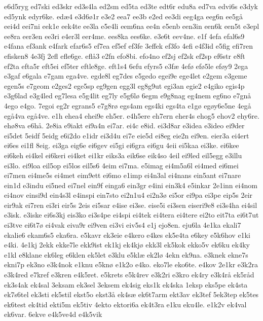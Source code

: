 {e6d5ryg
ed7ski
ed3skr
ed3s4la
ed2sm
ed5ta
ed3te
edt6r
edu8a
ed7va
edvi6s
e3dyk
ed5ynk
edyr6ke.
ed^^e64
e3d6^^f81r
e3e2
eea7
ee3b
e2ed
ee3di
eeg4ga
eeg6n
ee5g^^e5
eei4d
eei7ni
eek1e
eek4te
ee3la
e5e4li
eem6na
ee4n
e5enb
een3in
een6k
een5t
e3epl
ee8ra
eer3en
ee3ri
e4er3l
eer4me.
ees8ka
ees6ke.
e3e6t
eev4ne.
e1f
4efa
efal6s9
e4fana
ef3ank
e4fark
efar6s5
ef7ea
ef5ef
ef3fe
3effek
ef3fo
4efi
e4f3id
e5fig
efi7ren
efisken8
4e3fj
2efl
efle6ge.
efl^^e53
e2fn
efo8bi.
efo4no
ef2sj
ef2sk
ef2sp
ef6str
e8ft
ef2ta
efta5r
eft5ei
ef5ter
eftle8ge.
eft1s4
6efu
efyrs5
e3f^^e6
4ef^^f8
ef^^f85le
ef^^f8y9
2ega
e3gaf
e6gala
e7gam
ega4ve.
egde8l
eg7des
e5gedo
egei9e
ege4let
e2gem
e3geme
egen5s
e7geom
e2ges2
ege5sp
eg9gen
egg3l
eg8g9ut
egi3an
egie2
e4giko
egis4p
e3g6lad
e3g4led
eg7lesa
e5g4lit
eg7ly
e5g6l^^f8
6egm
e9g8nag
eg4nem
eg6no
e7gn^^e5
4ego
e4go.
7egoi
eg2r
egrans5
e7g8r^^f8
egs4am
egs4ki
egs4ta
e1g^^f8
eg^^f8y6e5ne
4eg^^e5
eg^^e54va
eg^^e54ve.
e1h
ehea4
ehei9e
eh5er.
e4h5ere
eh7ern
eher4s
ehog5
ehov2
ehy6re.
eh^^f88va
e6h^^e5.
2e8ia
e9iakt
ei9a4n
ei7ar.
ei4c
e8id.
ei3d8ar
e3idea
e3ideo
ei9der
ei5det
5eidf
5eidg
e6i2do
e1idr
ei3d4u
ei7e
eie5d
ei8eg
eie2n
ei9en.
eier3a
ei4ert
ei6es
ei1fl
8eig.
ei3ga
eig6e
ei6gev
ei5gi
ei6gra
ei6gu
4eii
ei5kaa
ei3ke.
ei6kee
ei6keh
ei4kel
ei6keri
ei4ket
ei1kr
eiks3a
eik6se
eik4so
4eil
ei9led
eil5egg
e3illu
ei3lo.
ei9loa
eil5op
ei5los
eil5s6
4eim
ei7ma.
e5imag
ei4m5a6l
ei4med
ei6mei
ei7men
ei4me5s
ei4met
eim9ett
ei6mo
e1imp
ei4n3al
ei4nans
ein5ant
ei7nare
ein1d
e3indu
ei5ned
ei7nel
ein9f
einga6
ein3gr
e4ini
ein3k4
e5inkar
2e1inn
ei4nom
ei4nov
einsi9d
ein4s3l
e4inspi
ein7sto
ei2n1u4
ei2n3^^f8
ei5or
ei9pa
ei3pe
eip5s
2eir
eir9ak
ei7ren
ei3ri
eir5s
2eis
ei5sar
e4ise
ei3se.
eise5i
ei3sen
eiseri9e8
ei3s4ha
ei4sil
e3isk.
e3iske
ei6s3kj
eis3ko
ei3s4pe
ei4spi
ei4tek
ei4tera
ei4tere
ei2to
eit7ta
ei6t7ut
ei3tve
ei6t7^^f8
ei4vak
eiva9r
ei9ven
ei3vi
eiv5s4
e1j
ejo8en.
eju6la
4e1ka
ekali7
ekalie6
ekam6s5
eka6ra.
e5kavr
ek3eie
e4kero
e4kes
ek5e4ta
e6key
e5k6hov
e1ki
e4ki.
4e1kj
2ekk
ekke7le
ekk9ist
ek1kj
ek4kj^^f8
ekk3l
ek5kok
ekko5v
ek6ku
ek4ky
e1kl
e8klane
ek6leg
e6klen
ek5let
e3klu
e5kl^^e6
ek2l^^f8
4ekn
ek9na.
e3knek
ekne7s
ekni7p
ek3no
e3k4nok
e1knu
e5kn^^f8
e1k2o
e4ko.
eko7le
eko6te.
e4kov
2e1kr
e3k2ra
e3k4red
e7kref
e3kren
e4k5ret.
e5krets
e5k4rev
e3k2ri
e3kro
ek4ry
e3k4r^^e5
ek5r^^e5d
ek3s4ak
ek4sal
3eksam
ek3sel
3eksem
ek4sig
eks1k
ek4ska
1eksp
eks5pe
ek4sta
ek7s6tel
ek3sti
ek5stil
ekst5o
ekst3^^e5
ek4s^^e6
ek6t7arm
ekt3av
ek3tef
5ek3tep
ek5tes
ek6test
ek4tid
ekti5m
ek5tiv
4ekto
ektori6a
ek4t3ra
e1ku
eku4le.
e1k2v
ek4val
ek6var.
6ekve
e4k5ve4d
e4k5vik
}

